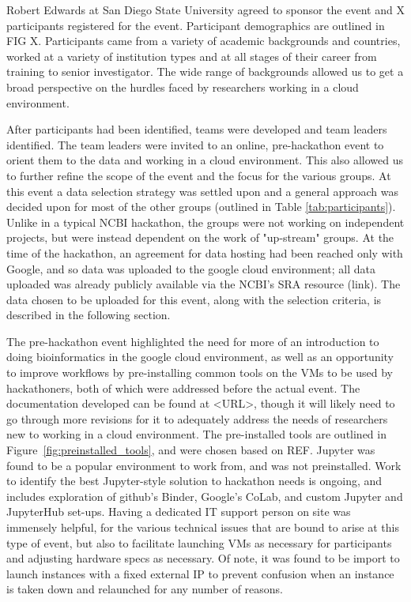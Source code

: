 \documentclass[genes, moreauthors]{Definitions/mdpi}
\begin{document}
  Robert Edwards at San Diego State University agreed to sponsor the event and
  X participants registered for the event. Participant demographics are
  outlined in FIG X. Participants came from a variety of academic backgrounds
  and countries, worked at a variety of institution types and at all stages of
  their career from training to senior investigator. The wide range of
  backgrounds allowed us to get a broad perspective on the hurdles faced by
  researchers working in a cloud environment.

  After participants had been identified, teams were developed and team leaders
  identified. The team leaders were invited to an online, pre-hackathon event
  to orient them to the data and working in a cloud environment. This also
  allowed us to further refine the scope of the event and the focus for the
  various groups. At this event a data selection strategy was settled upon and
  a general approach was decided upon for most of the other groups (outlined in
  Table \ref{tab:participants}). Unlike in a typical NCBI hackathon, the groups were
  not working on independent projects, but were instead dependent on the work
  of "up-stream" groups. At the time of the hackathon, an agreement for data
  hosting had been reached only with Google, and so data was uploaded to the
  google cloud environment; all data uploaded was already publicly available
  via the NCBI's SRA resource (link). The data chosen to be uploaded for this
  event, along with the selection criteria, is described in the following
  section.

  The pre-hackathon event highlighted the need for more of an introduction to
  doing bioinformatics in the google cloud environment, as well as an
  opportunity to improve workflows by pre-installing common tools on the VMs to
  be used by hackathoners, both of which were addressed before the actual
  event. The documentation developed can be found at <URL>, though it will
  likely need to go through more revisions for it to adequately address the
  needs of researchers new to working in a cloud environment. The pre-installed
  tools are outlined in Figure~\ref{fig:preinstalled_tools}, and were chosen
  based on REF. Jupyter \cite{jupyterNotebook} was found to be a popular
  environment to work from, and was not preinstalled. Work to identify the best
  Jupyter-style solution to hackathon needs is ongoing, and includes
  exploration of github's Binder, Google's CoLab, and custom Jupyter and
  JupyterHub set-ups. Having a dedicated IT support person on site was
  immensely helpful, for the various technical issues that are bound to arise
  at this type of event, but also to facilitate launching VMs as necessary for
  participants and adjusting hardware specs as necessary. Of note, it was found
  to be import to launch instances with a fixed external IP to prevent
  confusion when an instance is taken down and relaunched for any number of
  reasons.
\end{document}
